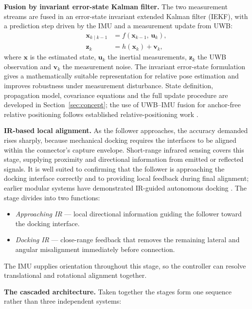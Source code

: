 \documentclass[11pt,a4paper]{article}
\newif\ifreview
\newcommand{\pending}[1]{\ifreview{\color{blue}#1}\else#1\fi}
\begin{document}
{\noindent\textbf{Fusion by invariant error-state Kalman filter.} The two
measurement streams are fused in an error-state invariant extended Kalman
filter (IEKF), with a prediction step driven by the IMU and a measurement
update from UWB:
\begin{align}
  \mathbf{x}_{k\mid k-1} &= f\!\left(\mathbf{x}_{k-1},\, \mathbf{u}_k\right),
  \label{eq:iekf-predict}\\
  \mathbf{z}_k &= h\!\left(\mathbf{x}_k\right) + \mathbf{v}_k,
  \label{eq:iekf-update}
\end{align}
where $\mathbf{x}$ is the estimated state, $\mathbf{u}_k$ the inertial
measurements, $\mathbf{z}_k$ the UWB observation and $\mathbf{v}_k$ the
measurement noise. The invariant error-state formulation gives a
mathematically suitable representation for relative pose estimation and
improves robustness under measurement disturbance. State definition,
propagation model, covariance equations and the full update procedure are
developed in Section~\ref{sec:concept}; the use of UWB--IMU fusion for
anchor-free relative positioning follows established relative-positioning work
\cite{zhang2022}.

\noindent\textbf{IR-based local alignment.} As the follower approaches, the
accuracy demanded rises sharply, because mechanical docking requires the
interfaces to be aligned within the connector's capture envelope. Short-range
infrared sensing covers this stage, supplying proximity and directional
information from emitted or reflected signals. It is well suited to confirming
that the follower is approaching the docking interface correctly and to
providing local feedback during final alignment; earlier modular systems have
demonstrated IR-guided autonomous docking \cite{wei2011}. The stage divides
into two functions:

\begin{itemize}
  \item \emph{Approaching IR} --- local directional information guiding the
        follower toward the docking interface.
  \item \emph{Docking IR} --- close-range feedback that removes the remaining
        lateral and angular misalignment immediately before connection.
\end{itemize}

\noindent The IMU supplies orientation throughout this stage, so the controller
can resolve translational and rotational alignment together.
}

\pending{%
\noindent\textbf{The cascaded architecture.} Taken together the stages form
one sequence rather than three independent systems:
}
\end{document}
